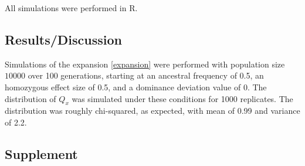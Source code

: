 \documentclass[a4paper,11pt]{article}
\begin{document}
All simulations were performed in R. 

\subsection*{Results/Discussion}
Simulations of the expansion \eqref{expansion} were performed with
population size $10000$ over 100 generations, starting at an ancestral
frequency of 0.5, an homozygous effect size of 0.5, and a dominance
deviation value of 0. The distribution of $Q_x$ was simulated under
these conditions for 1000 replicates. The distribution was roughly
chi-squared, as expected, with mean of 0.99 and variance of 2.2.  

\subsection*{Supplement}
\end{document}
